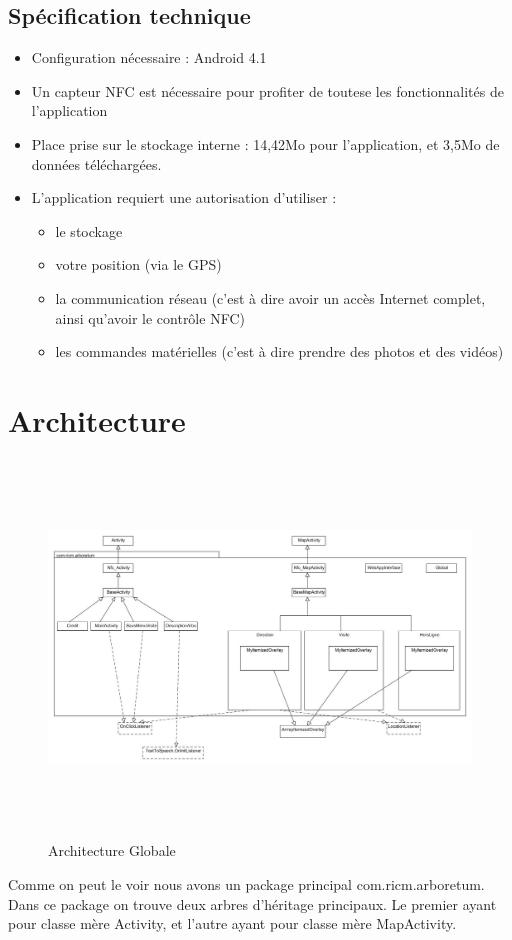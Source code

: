 \documentclass[a4paper,11pt]{article}
\begin{document}
    \subsection{Spécification technique}
      \begin{itemize}
       \item Configuration nécessaire : Android 4.1
       \item Un capteur NFC est nécessaire pour profiter de toutese les fonctionnalités de l'application
       \item Place prise sur le stockage interne : 14,42Mo pour l'application, et 3,5Mo de données téléchargées.
       \item L'application requiert une autorisation d'utiliser : 
     \begin{itemize}
      \item le stockage
      \item votre position (via le GPS)
      \item la communication réseau (c'est à dire avoir un accès Internet complet, ainsi qu'avoir le contrôle NFC)
      \item les commandes matérielles (c'est à dire prendre des photos et des vidéos)
     \end{itemize}
      \end{itemize}

   \section{Architecture}
    \begin{figure}[H]
     \begin{center}
      \includegraphics[width=18cm,height=10cm]{archi.jpg}
      \caption{Architecture Globale}
     \end{center}
    \end{figure}
    Comme on peut le voir nous avons un package principal com.ricm.arboretum. Dans ce package on trouve deux arbres d'héritage principaux. Le premier 
    ayant pour classe mère Activity, et l'autre ayant pour classe mère MapActivity.
    
\end{document}
